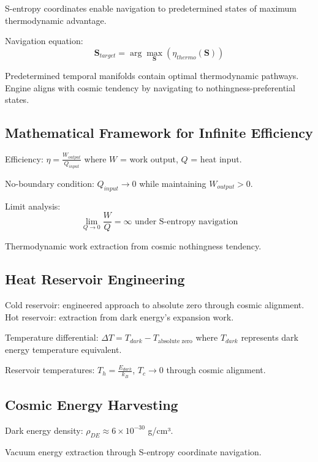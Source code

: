 \documentclass[12pt,a4paper]{article}
\begin{document}
S-entropy coordinates enable navigation to predetermined states of maximum thermodynamic advantage.

Navigation equation:
\begin{equation}
\mathbf{S}_{target} = \arg \max_{\mathbf{S}} \left( \eta_{thermo}(\mathbf{S}) \right)
\end{equation}

Predetermined temporal manifolds contain optimal thermodynamic pathways. Engine aligns with cosmic tendency by navigating to nothingness-preferential states.

\subsection{Mathematical Framework for Infinite Efficiency}

Efficiency: $\eta = \frac{W_{output}}{Q_{input}}$ where $W$ = work output, $Q$ = heat input.

No-boundary condition: $Q_{input} \to 0$ while maintaining $W_{output} > 0$.

Limit analysis:
\begin{equation}
\lim_{Q \to 0} \frac{W}{Q} = \infty \text{ under S-entropy navigation}
\end{equation}

Thermodynamic work extraction from cosmic nothingness tendency.

\subsection{Heat Reservoir Engineering}

Cold reservoir: engineered approach to absolute zero through cosmic alignment.
Hot reservoir: extraction from dark energy's expansion work.

Temperature differential: $\Delta T = T_{dark} - T_{\text{absolute zero}}$ where $T_{dark}$ represents dark energy temperature equivalent.

Reservoir temperatures: $T_h = \frac{E_{dark}}{k_B}$, $T_c \to 0$ through cosmic alignment.

\subsection{Cosmic Energy Harvesting}

Dark energy density: $\rho_{DE} \approx 6 \times 10^{-30}$ g/cm³.

Vacuum energy extraction through S-entropy coordinate navigation.
\end{document}
